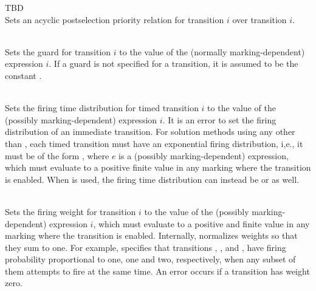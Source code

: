 {\begin{itemize}
{\item
{} TBD\\
Sets an acyclic postselection priority relation \cite{1995StewartBook-DiscreteSPN}
for transition $i$ over transition $i$.
} 

\item
{}\\
Sets the guard for transition $i$ to the value of the
(normally marking-dependent)  expression $i$.
If a guard is not specified for a transition, it is assumed to be
the constant .


\item
{}\\
Sets the firing time distribution for timed transition $i$ to the value
of the (possibly marking-dependent) expression $i$.
It is an error to set the firing distribution of an immediate transition.
For solution methods using any  other than ,
each timed transition must have an exponential firing distribution,
i,e., it must be of the form ,
where $e$ is a (possibly marking-dependent)  expression,
which must evaluate to a positive finite value in any marking
where the transition is enabled.
When  is used, the firing time distribution can instead be
 or  as well.

\item
{}\\
Sets the firing weight for transition $i$ to the value of the
(possibly marking-dependent)  expression $i$,
which must evaluate to a positive and finite value in any marking
where the transition is enabled.
Internally, {\smart} normalizes weights so that they sum to one.
For example,  specifies that transitions
, , and , have firing probability proportional
to one, one and two, respectively, when any subset of them attempts
to fire at the same time.
An error occurs if a transition has weight zero.


\end{itemize}}
